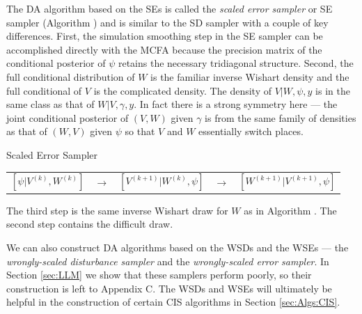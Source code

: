 \documentclass[12pt]{article}
\begin{document}
The DA algorithm based on the SEs is called the {\it scaled error sampler} or SE sampler (Algorithm ) and is similar to the SD sampler with a couple of key differences. First, the simulation smoothing step in the SE sampler can be accomplished directly with the MCFA because the precision matrix of the conditional posterior of $\psi$ retains the necessary tridiagonal structure. Second, the full conditional distribution of $W$ is the familiar inverse Wishart density and the full conditional of $V$ is the complicated density. The density of $V|W,\psi,y$ is in the same class as that of $W|V,\gamma,y$. In fact there is a strong symmetry here --- the joint conditional posterior of $(V,W)$ given $\gamma$ is from the same family of densities as that of $(W,V)$ given $\psi$ so that $V$ and $W$ essentially switch places.
\begin{alg*}[SE]Scaled Error Sampler\label{alg:DLMerror}
{\small \vspace{-.5cm}
\begin{center}
\begin{tabular}{lllll}
$[\psi|V^{(k)},W^{(k)}]$ & $\to$ & $[V^{(k+1)}|W^{(k)},\psi]$ & $\to$ & $[W^{(k+1)}|V^{(k+1)},\psi]$
\end{tabular}
\end{center}
}
\end{alg*}
\noindent The third step is the same inverse Wishart draw for $W$ as in Algorithm . The second step contains the difficult draw.

We can also construct DA algorithms based on the WSDs and the WSEs --- the {\it wrongly-scaled disturbance sampler} and the {\it wrongly-scaled error sampler}. In Section \ref{sec:LLM} we show that these samplers perform poorly, so their construction is left to Appendix C. The WSDs and WSEs will ultimately be helpful in the construction of certain CIS algorithms in Section \ref{sec:Algs:CIS}.
\end{document}
